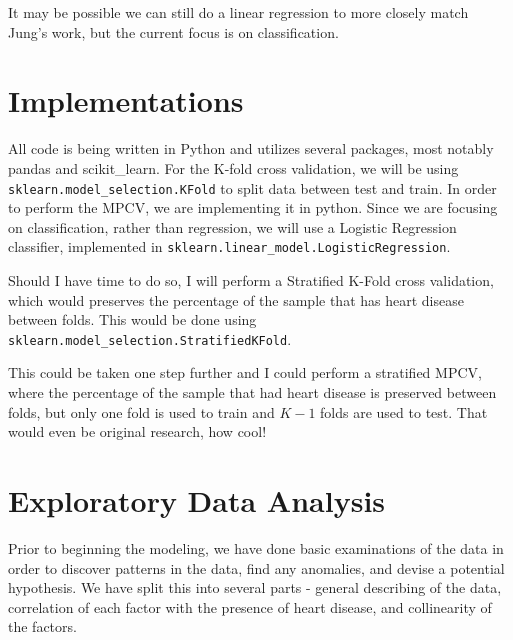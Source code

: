 \documentclass[letter]{article}
\def\code#1{\texttt{#1}}
\begin{document}
It may be possible we can still do a linear regression to more closely match Jung's work, but the current focus is on classification.
\section{Implementations}
All code is being written in Python and utilizes several packages, most notably pandas and scikit\_learn.  For the K-fold cross validation, we will be using \code{sklearn.model\_selection.KFold} to split data between test and train.  In order to perform the MPCV, we are implementing it in python.  Since we are focusing on classification, rather than regression, we will use a Logistic Regression classifier, implemented in  \code{sklearn.linear\_model.LogisticRegression}.

Should I have time to do so, I will perform a Stratified K-Fold cross validation, which would preserves the percentage of the sample that has heart disease between folds.  This would be done using \code{sklearn.model\_selection.StratifiedKFold}.

This could be taken one step further and I could perform a stratified MPCV, where the percentage of the sample that had heart disease is preserved between folds, but only one fold is used to train and \(K-1\) folds are used to test.  That would even be original research, how cool!

\section{Exploratory Data Analysis}
Prior to beginning the modeling, we have done basic examinations of the data in order to discover patterns in the data, find any anomalies, and devise a potential hypothesis.  We have split this into several parts - general describing of the data, correlation of each factor with the presence  of heart disease, and collinearity of the factors.
\end{document}
